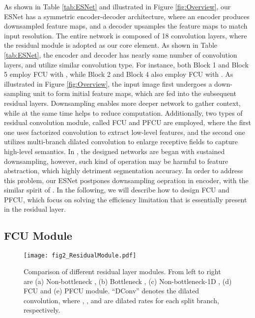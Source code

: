 \documentclass[runningheads]{llncs}
\begin{document}
As shown in Table \ref{tab:ESNet} and illustrated in Figure \ref{fig:Overview}, our ESNet has a symmetric encoder-decoder architecture, where an encoder produces downsampled feature maps, and a decoder upsamples the feature maps to match input resolution. The entire network is composed of 18 convolution layers, where the residual module is adopted as our core element. As shown in Table \ref{tab:ESNet}, the encoder and decoder has nearly same number of convolution layers, and utilize similar convolution type. For instance, both Block 1 and Block 5 employ FCU with , while Block 2 and Block 4 also employ FCU with . As illustrated in Figure \ref{fig:Overview}, the input image first undergoes a down-sampling unit to form initial feature maps, which are fed into the subsequent residual layers. Downsampling enables more deeper network to gather context, while at the same time helps to reduce computation. Additionally, two types of residual convolution module, called FCU and PFCU are employed, where the first one uses factorized convolution to extract low-level features, and the second one utilizes multi-branch dilated convolution to enlarge receptive fields to capture high-level semantics. In \cite{Paszke2016enet,Romera2018erfnet,fast2019zhang}, the designed networks are began with sustained downsampling, however, such kind of operation may be harmful to feature abstraction, which highly detriment segmentation accuracy. In order to address this problem, our ESNet postpones downsampling oepration in encoder, with the similar spirit of \cite{Szegedy2016rethinking}. In the following, we will describe how to design FCU and PFCU, which focus on solving the efficiency limitation that is essentially present in the residual layer.

\subsection{FCU Module}\label{sec:FCU}

\begin{figure}[!t]
\centerline{\texttt{[image: fig2\_ResidualModule.pdf]}}
\caption{Comparison of different residual layer modules. From left to right are (a) Non-bottleneck \cite{he2016deep}, (b) Bottleneck \cite{Paszke2016enet}, (c) Non-bottleneck-1D \cite{Romera2018erfnet}, (d) FCU and (e) PFCU module. ``DConv'' denotes the dilated convolution, where , , and  are dilated rates for each split branch, respectively.} \label{fig:ResidualModule}
\end{figure}
\end{document}
